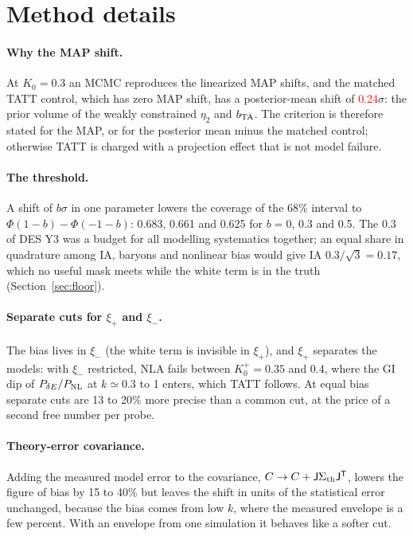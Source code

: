 \documentclass[11pt]{article}
\newcommand{\PNL}{P_{\rm NL}}
\newcommand{\PdE}{P_{\delta E}}
\newcommand{\T}{^{\mathsf{T}}}
\newif\ifnumbersfinal
\newcommand{\refresh}[1]{\ifnumbersfinal#1\else\textcolor{red}{#1}\fi}
\newcommand{\Projection}{\refresh{0.24}}
\begin{document}
\appendix

\section{Method details}
\label{app:method}

\paragraph{Why the MAP shift.}
At $K_0 = 0.3$ an MCMC reproduces the linearized MAP shifts, and the
matched TATT control, which has zero MAP shift, has a posterior-mean
shift of \Projection$\sigma$: the prior volume of the weakly
constrained $\eta_2$ and $b_{\rm TA}$. The criterion is therefore stated
for the MAP, or for the posterior mean minus the matched control;
otherwise TATT is charged with a projection effect that is not model
failure.

\paragraph{The threshold.}
A shift of $b\sigma$ in one parameter lowers the coverage of the 68\%
interval to $\Phi(1-b) - \Phi(-1-b)$: 0.683, 0.661 and 0.625 for $b =
0$, 0.3 and 0.5. The 0.3 of DES Y3 was a budget for all modelling
systematics together; an equal share in quadrature among IA, baryons
and nonlinear bias would give IA $0.3/\sqrt3 = 0.17$, which no useful
mask meets while the white term is in the truth
(Section~\ref{sec:floor}).

\paragraph{Separate cuts for $\xi_+$ and $\xi_-$.}
The bias lives in $\xi_-$ (the white term is invisible in $\xi_+$),
and $\xi_+$ separates the models: with $\xi_-$ restricted, NLA fails
between $K_0^+ = 0.35$ and 0.4, where the GI dip of $\PdE/\PNL$ at
$k \simeq 0.3$ to 1 enters, which TATT follows. At equal bias separate
cuts are 13 to 20\% more precise than a common cut, at the price of a
second free number per probe.

\paragraph{Theory-error covariance.}
Adding the measured model error to the covariance, $C \to C +
\mathsf{J}\Sigma_{\rm th}\mathsf{J}\T$, lowers the figure of bias by 15
to 40\% but leaves the shift in units of the statistical error
unchanged, because the bias comes from low $k$, where the measured
envelope is a few percent. With an envelope from one simulation it
behaves like a softer cut.
\end{document}
